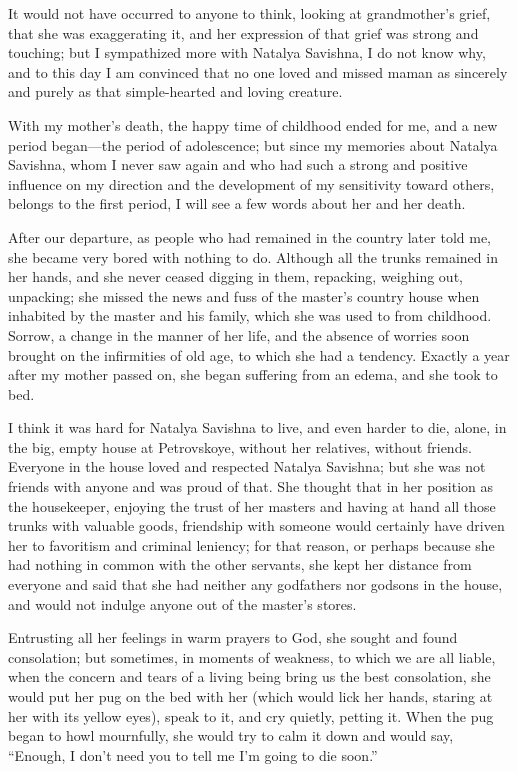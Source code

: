 It would not have occurred to anyone to think, looking at grandmother's grief, that she was exaggerating it, and her expression of that grief was strong and touching; but I sympathized more with Natalya Savishna, I do not know why, and to this day I am convinced that no one loved and missed maman as sincerely and purely as that simple-hearted and loving creature.

With my mother's death, the happy time of childhood ended for me, and a new period began---the period of adolescence; but since my memories about Natalya Savishna, whom I never saw again and who had such a strong and positive influence on my direction and the development of my sensitivity toward others, belongs to the first period, I will see a few words about her and her death.

After our departure, as people who had remained in the country later told me, she became very bored with nothing to do. Although all the trunks remained in her hands, and she never ceased digging in them, repacking, weighing out, unpacking; she missed the news and fuss of the master's country house when inhabited by the master and his family, which she was used to from childhood. Sorrow, a change in the manner of her life, and the absence of worries soon brought on the infirmities of old age, to which she had a tendency. Exactly a year after my mother passed on, she began suffering from an edema, and she took to bed.

I think it was hard for Natalya Savishna to live, and even harder to die, alone, in the big, empty house at Petrovskoye, without her relatives, without friends. Everyone in the house loved and respected Natalya Savishna; but she was not friends with anyone and was proud of that. She thought that in her position as the housekeeper, enjoying the trust of her masters and having at hand all those trunks with valuable goods, friendship with someone would certainly have driven her to favoritism and criminal leniency; for that reason, or perhaps because she had nothing in common with the other servants, she kept her distance from everyone and said that she had neither any godfathers nor godsons in the house, and would not indulge anyone out of the master's stores.

Entrusting all her feelings in warm prayers to God, she sought and found consolation; but sometimes, in moments of weakness, to which we are all liable, when the concern and tears of a living being bring us the best consolation, she would put her pug on the bed with her (which would lick her hands, staring at her with its yellow eyes), speak to it, and cry quietly, petting it. When the pug began to howl mournfully, she would try to calm it down and would say, ``Enough, I don't need you to tell me I'm going to die soon.'' %

